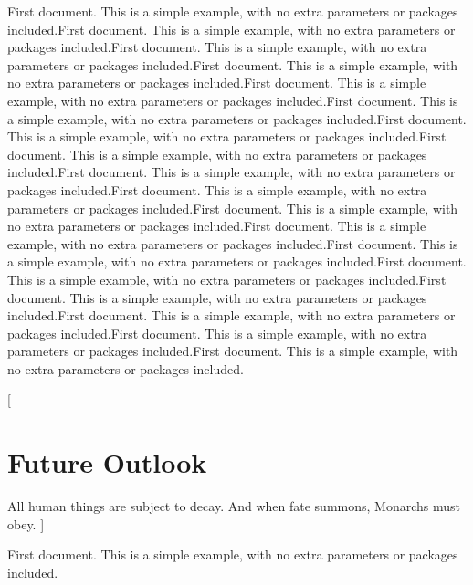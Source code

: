 \documentclass{article}
\begin{document}
\begin{multicols}{2}
First document. This is a simple example, with no 
extra parameters or packages included.First document. This is a simple example, with no 
extra parameters or packages included.First document. This is a simple example, with no 
extra parameters or packages included.First document. This is a simple example, with no 
extra parameters or packages included.First document. This is a simple example, with no 
extra parameters or packages included.First document. This is a simple example, with no 
extra parameters or packages included.First document. This is a simple example, with no 
extra parameters or packages included.First document. This is a simple example, with no 
extra parameters or packages included.First document. This is a simple example, with no 
extra parameters or packages included.First document. This is a simple example, with no 
extra parameters or packages included.First document. This is a simple example, with no 
extra parameters or packages included.First document. This is a simple example, with no 
extra parameters or packages included.First document. This is a simple example, with no 
extra parameters or packages included.First document. This is a simple example, with no 
extra parameters or packages included.First document. This is a simple example, with no 
extra parameters or packages included.First document. This is a simple example, with no 
extra parameters or packages included.First document. This is a simple example, with no 
extra parameters or packages included.First document. This is a simple example, with no 
extra parameters or packages included.

[
\section{Future Outlook}
All human things are subject to decay. And when fate summons, Monarchs must obey.
]

First document. This is a simple example, with no 
extra parameters or packages included.
\end{multicols}
\end{document}
